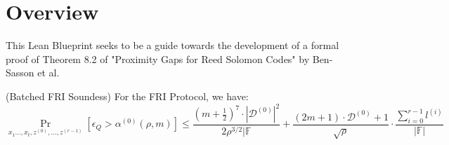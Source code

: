 %

\chapter*{Overview}

This Lean Blueprint seeks to be a guide towards the development of a formal proof of Theorem 8.2 of "Proximity Gaps for Reed Solomon Codes" by Ben-Sasson et al.

\begin{theorem} 
  (Batched FRI Soundess)
  For the FRI Protocol, we have:
  \begin{equation}
    \Pr_{x_1 \dots, x_t, z^{(0)}, \dots, z^{(r-1)}} \left[ \epsilon_Q > \alpha^{(0)}(\rho, m) \right]
    \le \frac{(m + \frac{1}{2})^7 \cdot |\mathcal{D}^{(0)}|^2}{2\rho^{3/2}|\mathbb{F}}
    + \frac{(2m+1) \cdot \mathcal{D}^{(0)}+1}{\sqrt{\rho}}
    \cdot \frac{\sum_{i=0}^{r-1} l^{(i)}}{|\mathbb{F}|}
  \end{equation}
\end{theorem}
